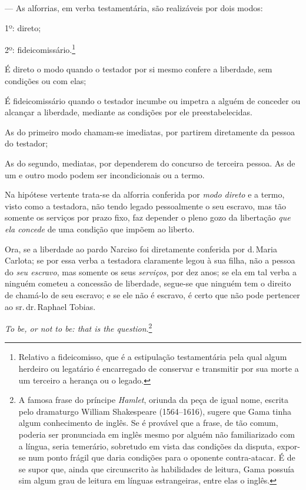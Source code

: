 --- As alforrias, em verba testamentária, são realizáveis por dois
modos:

1º: direto;

2º: fideicomissário.\footnote{ Relativo a
  fideicomisso, que é a estipulação testamentária pela qual algum
  herdeiro ou legatário é encarregado de conservar e transmitir por sua
  morte a um terceiro a herança ou o legado.}

É direto o modo quando o testador por si mesmo confere a liberdade, sem
condições ou com elas;

É fideicomissário quando o testador incumbe ou impetra a alguém de
conceder ou alcançar a liberdade, mediante as condições por ele
preestabelecidas.

As do primeiro modo chamam-se imediatas, por partirem diretamente da
pessoa do testador;

As do segundo, mediatas, por dependerem do concurso de terceira pessoa.
As de um e outro modo podem ser incondicionais ou a termo.

Na hipótese vertente trata-se da alforria conferida por \emph{modo
direto} e a termo, visto como a testadora, não tendo legado pessoalmente
o seu escravo, mas tão somente os serviços por prazo fixo, faz depender
o pleno gozo da libertação \emph{que ela concede} de uma condição que
impõem ao liberto.

Ora, se a liberdade ao pardo Narciso foi diretamente conferida por
d.\,Maria Carlota; se por essa verba a testadora claramente legou à sua
filha, não a pessoa do \emph{seu escravo}, mas somente os seus
\emph{serviços}, por dez anos; se ela em tal verba a ninguém cometeu a
concessão de liberdade, segue-se que ninguém tem o direito de chamá-lo
de seu escravo; e se ele não é escravo, é certo que não pode pertencer
ao sr.\,dr.\,Raphael Tobias.

\emph{To be, or not to be: that is the question}.\footnote{ A famosa
  frase do príncipe \emph{Hamlet}, oriunda da peça de igual nome,
  escrita pelo dramaturgo William Shakespeare (1564--1616), sugere que
  Gama tinha algum conhecimento de inglês. Se é provável que a frase, de
  tão comum, poderia ser pronunciada em inglês mesmo por alguém não
  familiarizado com a língua, seria temerário, sobretudo em vista das
  condições da disputa, expor-se num ponto frágil que daria condições
  para o oponente contra-atacar. É de se supor que, ainda que
  circunscrito às habilidades de leitura, Gama possuía sim algum grau de
  leitura em línguas estrangeiras, entre elas o inglês.}

